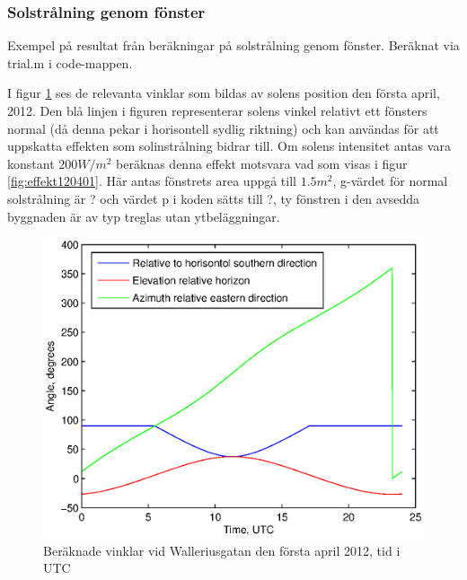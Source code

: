 \subsubsection{Solstrålning genom fönster}

Exempel på resultat från beräkningar på solstrålning genom fönster. Beräknat via trial.m i code-mappen.

I figur \ref{fig:vinklar120401} ses de relevanta vinklar som bildas av solens position den första april, 2012. Den blå linjen i figuren representerar solens vinkel relativt ett fönsters normal (då denna pekar i horisontell sydlig riktning) och kan användas för att uppskatta effekten som solinstrålning bidrar till. Om solens intensitet antas vara konstant $\unit{200}{W/m^2}$ beräknas denna effekt motsvara vad som visas i figur \ref{fig:effekt120401}. Här antas fönstrets area uppgå till $\unit{1.5}{m^2}$, g-värdet för normal solstrålning är ? och värdet p i koden sätts till ?, ty fönstren i den avsedda byggnaden är av typ treglas utan ytbeläggningar.

\begin{figure}[hpbt]
\centering
\includegraphics[scale=1]{images/angles120401.eps}
\caption{\label{fig:vinklar120401} Beräknade vinklar vid Walleriusgatan den första april 2012, tid i UTC}
\end{figure}

